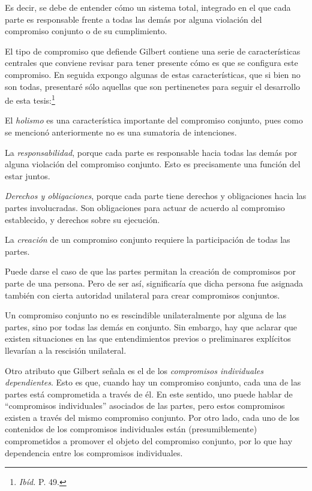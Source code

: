\documentclass[oneside]{book}
\begin{document}
Es decir, se debe de entender cómo un sistema total, integrado en el que cada parte es responsable frente a todas las demás por alguna violación del compromiso conjunto o de su cumplimiento. 

El tipo de compromiso que defiende Gilbert contiene una serie de características centrales que conviene revisar para tener presente cómo es que se configura este compromiso. En seguida expongo algunas de estas características, que si bien no son todas, presentaré sólo aquellas que son pertinenetes para seguir el desarrollo de esta tesis:\footnote{\textit{Ibíd.} P. 49.}

El \textit{holismo} es una característica importante del compromiso conjunto, pues como se mencionó anteriormente no es una sumatoria de intenciones.

La \textit{responsabilidad}, porque cada parte es responsable hacia todas las demás por alguna violación del compromiso conjunto. Esto es precisamente una función del estar juntos. 

\textit{Derechos y obligaciones}, porque cada parte tiene derechos y obligaciones hacia las partes involucradas. Son obligaciones para actuar de acuerdo al compromiso establecido, y derechos sobre su ejecución. 

La \textit{creación} de un compromiso conjunto requiere la participación de todas las partes. 

Puede darse el caso de que las partes permitan la creación de compromisos por parte de una persona. Pero de ser así, significaría que dicha persona fue asignada también con cierta autoridad unilateral para crear compromisos conjuntos.

Un compromiso conjunto no es rescindible unilateralmente por alguna de las partes, sino por todas las demás en conjunto. Sin embargo, hay que aclarar que existen situaciones en las que entendimientos previos o preliminares explícitos llevarían a la rescisión unilateral. 

Otro atributo que Gilbert señala es el de los \textit{compromisos individuales dependientes}. Esto es que, cuando hay un compromiso conjunto, cada una de las partes está comprometida a través de él. En este sentido, uno puede hablar de “compromisos individuales” asociados de las partes, pero estos compromisos existen a través del mismo compromiso conjunto. Por otro lado, cada uno de los contenidos de los compromisos individuales están (presumiblemente) comprometidos a promover el objeto del compromiso conjunto, por lo que hay dependencia entre los compromisos individuales.
\end{document}
